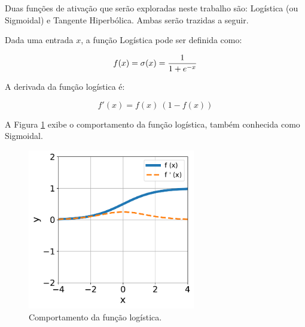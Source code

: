 Duas funções de ativação que serão exploradas neste trabalho são: Logística (ou Sigmoidal) e Tangente Hiperbólica. Ambas serão trazidas a seguir.



\linebreak
\newpage


\begin{definition}
    Dada uma entrada $x$, a função Logística pode ser definida como:

    \begin{equation}
        f(x) = \sigma (x) = \dfrac{1}{1 + e^{-x}}
        \vspace{0.2cm}
        \label{eq:ann_logistic_function}
    \end{equation}

    A derivada da função logística é:

    \begin{equation}
        f'(x) = f(x)\ (1 - f(x))
        \label{eq:ann_logistic_function_dy}
    \end{equation}
    
\end{definition}

A Figura \ref{fig:ann_logistic_function} exibe o comportamento da função logística, também conhecida como Sigmoidal.

\begin{figure}[H]
    \centering
    \includegraphics[width=0.65\textwidth]{figs/ann_logistic_function.pdf}

    \caption{Comportamento da função logística.}
    \label{fig:ann_logistic_function}
\end{figure}





